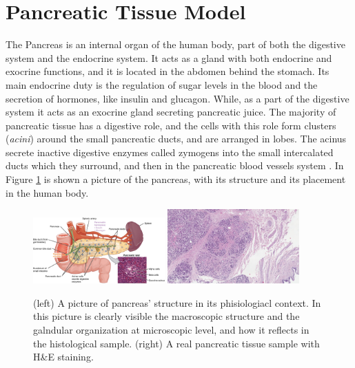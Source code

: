 \section{Pancreatic Tissue Model} \label{ssec:panc_tis_mod}
The Pancreas is an internal organ of the human body, part of both the digestive system and the endocrine system. It acts as a gland with both endocrine and exocrine functions, and it is located in the abdomen behind the stomach. Its main endocrine duty is the regulation of sugar levels in the blood and the secretion of hormones, like insulin and glucagon. While, as a part of the digestive system it acts as an exocrine gland secreting pancreatic juice. The majority of pancreatic tissue has a digestive role, and the cells with this role form clusters (\textit{acini}) around the small pancreatic ducts, and are arranged in lobes. The acinus secrete inactive digestive enzymes called zymogens into the small intercalated ducts which they surround, and then in the pancreatic blood vessels system \cite{Pancreas}. In Figure \ref{fig:panc_struct} is shown a picture of the pancreas, with its structure and its placement in the human body.

\begin{figure}
    \centering
    \includegraphics[width = 0.45\textwidth]{images/panc_struct}
    \includegraphics[width = 0.45\textwidth]{images/panc_specimen}
    \caption{(left) A picture of pancreas' structure in its phisiologiacl context. In this picture is clearly visible the macroscopic structure and the galndular organization at microscopic level, and how it reflects in the histological sample. (right) A real pancreatic tissue sample with H\&E staining.}
    \label{fig:panc_struct}
\end{figure}

